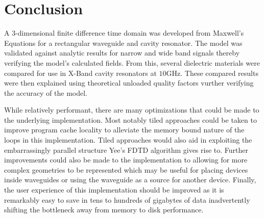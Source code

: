 \section{Conclusion}
\label{sec:conclusion}
A 3-dimensional finite difference time domain was developed from Maxwell's Equations for a rectangular waveguide and cavity resonator. The model was validated against analytic results for narrow and wide band signals thereby verifying the model's calculated fields. From this, several dielectric materials were compared for use in X-Band cavity resonators at $10$GHz. These compared results were then explained using theoretical unloaded quality factors vurther verifying the accuracy of the model.

While relatively performant, there are many optimizations that could be made to the underlying implementation. Most notably tiled approaches could be taken to improve program cache locality to alleviate the memory bound nature of the loops in this implementation. Tiled approaches would also aid in exploiting the embarrassingly parallel structure Yee's FDTD algorithm gives rise to. Further improvements could also be made to the implementation to allowing for more complex geometries to be represented which may be useful for placing devices inside waveguides or using the waveguide as a source for another device. Finally, the user experience of this implementation should be improved as it is remarkably easy to save in tens to hundreds of gigabytes of data inadvertently shifting the bottleneck away from memory to disk performance.